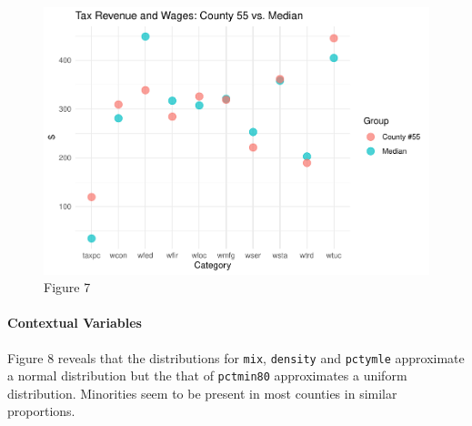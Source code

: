 \documentclass[]{article}
\let\oldparagraph\paragraph
\renewcommand{\paragraph}[1]{\oldparagraph{#1}\mbox{}}
\begin{document}
\begin{figure}

{\centering \includegraphics{lab_3_final_files/figure-latex/unnamed-chunk-21-1} 

}

\caption{Figure 7}\label{fig:unnamed-chunk-21}
\end{figure}

\hypertarget{contextual-variables-1}{%
\paragraph{Contextual Variables}\label{contextual-variables-1}}

Figure 8 reveals that the distributions for \texttt{mix},
\texttt{density} and \texttt{pctymle} approximate a normal distribution
but the that of \texttt{pctmin80} approximates a uniform distribution.
Minorities seem to be present in most counties in similar proportions.
\end{document}
